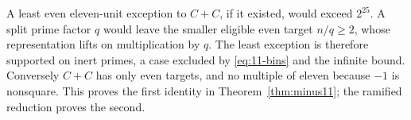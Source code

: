 A least even eleven-unit exception to $C+C$, if it existed, would
exceed $2^{25}$.  A split prime factor $q$ would leave the smaller
eligible even target $n/q\ge2$, whose representation lifts on
multiplication by $q$.  The least exception is therefore supported
on inert primes, a case excluded by \eqref{eq:11-bins} and the
infinite bound.  Conversely $C+C$ has only even targets, and no
multiple of eleven because $-1$ is nonsquare.  This proves the first
identity in Theorem~\ref{thm:minus11}; the ramified reduction proves
the second.
